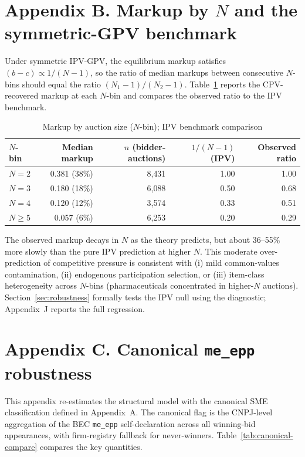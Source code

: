 \documentclass[12pt]{article}
\begin{document}
\section*{Appendix B. Markup by $N$ and the symmetric-GPV benchmark}
\label{app:markup}

Under symmetric IPV-GPV, the equilibrium markup satisfies
$(b - c) \propto 1/(N-1)$, so the ratio of median markups between
consecutive $N$-bins should equal the ratio $(N_1-1)/(N_2-1)$.
Table~\ref{tab:markup-by-n} reports the CPV-recovered markup at each
$N$-bin and compares the observed ratio to the IPV benchmark.

\begin{table}[htbp]
\centering
\caption{Markup by auction size ($N$-bin); IPV benchmark comparison}
\label{tab:markup-by-n}
\small
\begin{tabular}{lrrrr}
\toprule
$N$-bin & Median markup & $n$ (bidder-auctions) &
   $1/(N-1)$ (IPV) & Observed ratio \\
\midrule
$N = 2$     & 0.381 (38\%) & 8{,}431 & 1.00 & 1.00 \\
$N = 3$     & 0.180 (18\%) & 6{,}088 & 0.50 & 0.68 \\
$N = 4$     & 0.120 (12\%) & 3{,}574 & 0.33 & 0.51 \\
$N \ge 5$   & 0.057 (6\%)  & 6{,}253 & 0.20 & 0.29 \\
\bottomrule
\end{tabular}
\end{table}

The observed markup decays in $N$ as the theory predicts, but
about 36--55\% more slowly than the pure IPV prediction at higher
$N$. This moderate over-prediction of competitive pressure is
consistent with (i) mild common-values contamination, (ii)
endogenous participation selection, or (iii) item-class heterogeneity
across $N$-bins (pharmaceuticals concentrated in higher-$N$
auctions). Section~\ref{sec:robustness} formally tests the IPV
null using the \citet{hendricks2003} diagnostic; Appendix~J
reports the full regression.

\section*{Appendix C. Canonical \texttt{me\_epp} robustness}

This appendix re-estimates the structural model with the canonical SME
classification defined in Appendix~A. The canonical flag is the
CNPJ-level aggregation of the BEC \texttt{me\_epp} self-declaration
across all winning-bid appearances, with firm-registry fallback for
never-winners. Table~\ref{tab:canonical-compare} compares the key
quantities.
\end{document}
